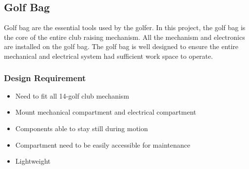\documentclass[11pt,landscape]{article}
\begin{document}
\begin{multicols}{2}
    
\end{multicols}
\newpage
\begin{multicols}{3}
    \subsection{Golf Bag}
    Golf bag are the essential tools used by the golfer. In this project, the
    golf bag is the core of the entire club raising mechanism. All the mechanism
    and electronics are installed on the golf bag. The golf bag is well designed
    to ensure the entire mechanical and electrical system had sufficient work
    space to operate. 
    
    \subsubsection*{Design Requirement}
    \begin{itemize}
        \item Need to fit all 14-golf club mechanism
        \item Mount mechanical compartment and electrical compartment
        \item Components able to stay still during motion
        \item Compartment need to be easily accessible for maintenance
        \item Lightweight 
    \end{itemize}
    

\end{multicols}
\end{document}
